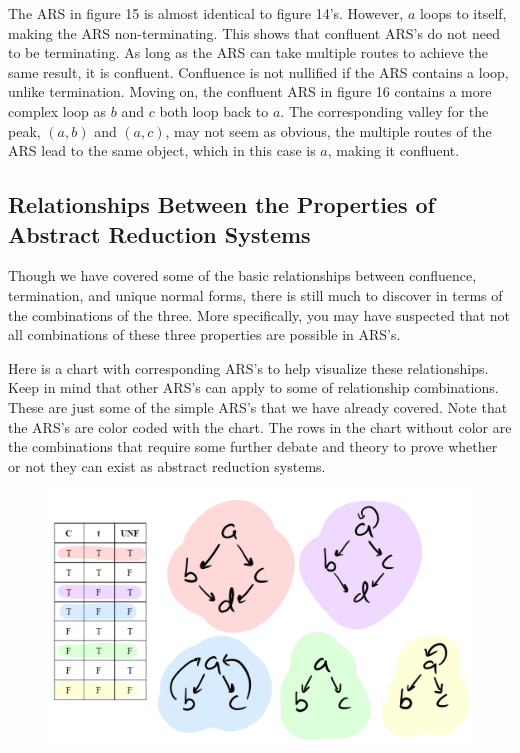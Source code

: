 \documentclass{article}
\begin{document}
\medskip\noindent
The ARS in figure 15 is almost identical to figure 14's. However, $a$ loops to itself, making the ARS non-terminating. This shows that confluent ARS's do not need to be terminating. As long as the ARS can take multiple routes to achieve the same result, it is confluent. Confluence  is not nullified if the ARS contains a loop, unlike termination. Moving on, the confluent ARS in figure 16 contains a more complex loop as $b$ and $c$ both loop back to $a$. The corresponding valley for the peak, $(a, b)$ and $(a, c)$, may not seem as obvious, the multiple routes of the ARS lead to the same object, which in this case is $a$, making it confluent.

\subsection{Relationships Between the Properties of Abstract Reduction Systems}

\medskip\noindent
Though we have covered some of the basic relationships between confluence, termination, and unique normal forms, there is still much to discover in terms of the combinations of the three. More specifically, you may have suspected that not all combinations of these three properties are possible in ARS’s.

\medskip\noindent
Here is a chart with corresponding ARS's to help visualize these relationships. Keep in mind that other ARS's can apply to some of relationship combinations. These are just some of the simple ARS's that we have already covered. Note that the ARS's are color coded with the chart. The rows in the chart without color are the combinations that require some further debate and theory to prove whether or not they can exist as abstract reduction systems.

\begin{figure}[h!]
  \centering
  \includegraphics[scale=0.06]{arsComparisonGen}
\end{figure}
\end{document}
